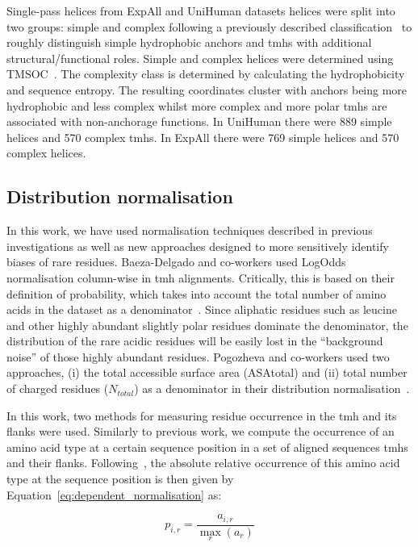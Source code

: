 Single-pass helices from ExpAll and UniHuman datasets helices were split into two groups: simple and complex following a previously described classification~\cite{Wong2011,Wong2012} to roughly distinguish simple hydrophobic anchors and \gls{tmh}s with additional structural/functional roles.
Simple and complex helices were determined using TMSOC~\cite{Wong2012}.
The complexity class is determined by calculating the hydrophobicity and sequence entropy.
The resulting coordinates cluster with anchors being more hydrophobic and less complex whilst more complex and more polar \gls{tmh}s are associated with non-anchorage functions.
In UniHuman there were 889 simple helices and 570 complex \gls{tmh}s.
In ExpAll there were 769 simple helices and 570 complex helices.

\subsection{Distribution normalisation}

In this work, we have used normalisation techniques described in previous investigations as well as new approaches designed to more sensitively identify biases of rare residues.
Baeza-Delgado and co-workers used LogOdds normalisation column-wise in \gls{tmh} alignments.
Critically, this is based on their definition of probability, which takes into account the total number of amino acids in the dataset as a denominator~\cite{Baeza-Delgado2013}.
Since aliphatic residues such as leucine and other highly abundant slightly polar residues dominate the denominator, the distribution of the rare acidic residues will be easily lost in the ``background noise'' of those highly abundant residues.
Pogozheva and co-workers used two approaches, (i) the total accessible surface area (ASAtotal) and (ii) total number of charged residues (${N}_{total}$) as a denominator in their distribution normalisation~\cite{Pogozheva2013}.

In this work, two methods for measuring residue occurrence in the \gls{tmh} and its flanks were used.
Similarly to previous work, we compute the occurrence  of an amino acid type  at a certain sequence position  in a set of aligned sequences \gls{tmh}s and their flanks.
Following~\cite{Sharpe2010}, the absolute relative occurrence  of this amino acid type at the sequence position  is then given by Equation~\ref{eq:dependent_normalisation} as:

\begin{equation} \label{eq:dependent_normalisation}
  p_{i,r}=\frac{a_{i,r}}{\underset{r}{\max}{(a_r)}}
\end{equation}



